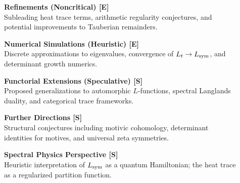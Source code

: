 \begin{description}
  \item[\textbf{}] \textbf{Refinements (Noncritical) [E]} \\
  Subleading heat trace terms, arithmetic regularity conjectures, and potential improvements to Tauberian remainders.

  \item[\textbf{}] \textbf{Numerical Simulations (Heuristic) [E]} \\
  Discrete approximations to eigenvalues, convergence of \( L_t \to L_{\mathrm{sym}} \), and determinant growth numerics.

  \item[\textbf{}] \textbf{Functorial Extensions (Speculative) [S]} \\
  Proposed generalizations to automorphic \( L \)-functions, spectral Langlands duality, and categorical trace frameworks.

  \item[\textbf{}] \textbf{Further Directions [S]} \\
  Structural conjectures including motivic cohomology, determinant identities for motives, and universal zeta symmetries.

  \item[\textbf{}] \textbf{Spectral Physics Perspective [S]} \\
  Heuristic interpretation of \( L_{\mathrm{sym}} \) as a quantum Hamiltonian; the heat trace as a regularized partition function.
\end{description}
